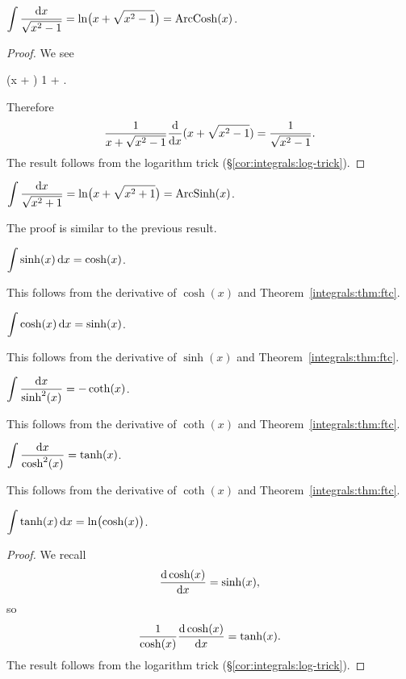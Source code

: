 \M $\displaystyle{\int\frac{\mathrm{d}x}{\sqrt{x^{2} - 1}} = \ln\bigl(x + \sqrt{x^{2}-1}\bigr)=\operatorname{ArcCosh}(x)}$.

\begin{proof}
We see
\begin{calculation}
  (x + )
  1 + 
  .
\end{calculation}
Therefore
\begin{equation}
\frac{1}{x + \sqrt{x^{2} - 1}}\frac{\mathrm{d}}{\mathrm{d} x}(x + \sqrt{x^{2} - 1})
= \frac{1}{\sqrt{x^{2} - 1}}.
\end{equation}
The result follows from the logarithm trick (\S\ref{cor:integrals:log-trick}).
\end{proof}

\M $\displaystyle{\int\frac{\mathrm{d}x}{\sqrt{x^{2} + 1}} = \ln\bigl(x + \sqrt{x^{2}+1}\bigr)=\operatorname{ArcSinh}(x)}$.

The proof is similar to the previous result.

\M $\displaystyle{\int\sinh(x)\,\mathrm{d}x = \cosh(x)}$.

This follows from the derivative of $\cosh(x)$ and Theorem~\ref{integrals:thm:ftc}.

\M $\displaystyle{\int\cosh(x)\,\mathrm{d}x = \sinh(x)}$.

This follows from the derivative of $\sinh(x)$ and Theorem~\ref{integrals:thm:ftc}.

\M $\displaystyle{\int\frac{\mathrm{d}x}{\sinh^{2}(x)} = -\coth(x)}$.

This follows from the derivative of $\coth(x)$ and Theorem~\ref{integrals:thm:ftc}.

\M $\displaystyle{\int\frac{\mathrm{d}x}{\cosh^{2}(x)} = \tanh(x)}$.

This follows from the derivative of $\coth(x)$ and Theorem~\ref{integrals:thm:ftc}.

\M $\displaystyle{\int\tanh(x)\,\mathrm{d}x = \ln\bigl(\cosh(x)\bigr)}$.

\begin{proof}
  We recall
  \begin{equation}
\frac{\mathrm{d}\cosh(x)}{\mathrm{d} x}=\sinh(x),
  \end{equation}
  so
  \begin{equation}
\frac{1}{\cosh(x)}\frac{\mathrm{d}\cosh(x)}{\mathrm{d} x}=\tanh(x).
  \end{equation}
The result follows from the logarithm trick (\S\ref{cor:integrals:log-trick}).
\end{proof}

